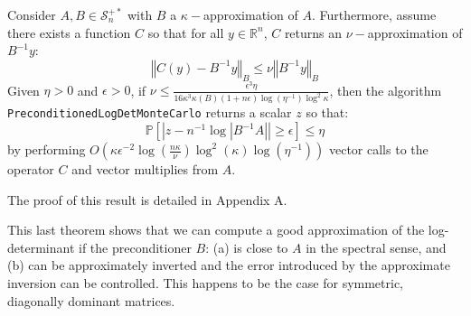 \begin{theorem}\label{thm:preconditioning-approx}Consider $A,B\in\mathcal{S}_{n}^{+*}$
with $B$ a $\kappa-$approximation of $A$. Furthermore, assume there
exists a function $C$ so that for all $y\in\mathbb{R}^{n}$, $C$
returns an $\nu-$approximation of $B^{-1}y$:
\[
\left\Vert C\left(y\right)-B^{-1}y\right\Vert _{B}\leq\nu\left\Vert B^{-1}y\right\Vert _{B}
\]
Given $\eta>0$ and $\epsilon>0$, if $\nu\leq\frac{\epsilon^{3}\eta}{16\kappa^{3}\kappa\left(B\right)\left(1+n\epsilon\right)\log\left(\eta^{-1}\right)\log^{2}\kappa}$,
then the algorithm \texttt{PreconditionedLogDetMonteCarlo} returns
a scalar $z$ so that:
\[
\mathbb{P}\left[\left|z-n^{-1}\log\left|B^{-1}A\right|\right|\geq\epsilon\right]\leq\eta
\]
by performing $O\left(\kappa\epsilon^{-2}\log\left(\frac{n\kappa}{\nu}\right)\log^{2}\left(\kappa\right)\log\left(\eta^{-1}\right)\right)$
vector calls to the operator $C$ and vector multiplies from $A$. 

\end{theorem}

The proof of this result is detailed in Appendix A.

This last theorem shows that we can compute a good approximation of
the log-determinant if the preconditioner $B$: (a) is close to $A$
in the spectral sense, and (b) can be approximately inverted and the
error introduced by the approximate inversion can be controlled. This
happens to be the case for symmetric, diagonally dominant matrices.
